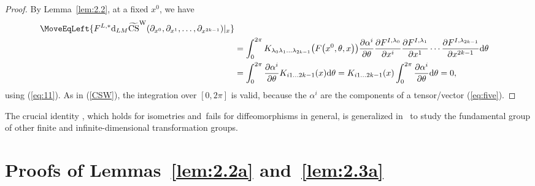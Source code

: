 \documentclass[pdftex]{sigma}
\numberwithin{equation}{section}
\theoremstyle{definition}
\newcommand{\bm}{ M}
\newcommand{\ocs}{\widetilde{{\rm CS}}}
\begin{document}
\begin{proof}
 By Lemma~\ref{lem:2.2}, at a fixed $x^0$, we have
 \begin{align*}
 \MoveEqLeft{ F^{L,*} {\rm d}_{L{\bm}} \ocs^{\rm W} (\partial_{x^0}, \partial_{x^1},\dots, \partial_{x^{2k-1}})|_{x} }\\
 &=
 \int_0^{2\pi} K_{\lambda_0 \lambda_1\dots\lambda_{2k-1}}\bigl(F\bigl(x^0,\theta,x\bigr)\bigr)
\frac{\partial \alpha^i}{\partial\theta} \frac{\partial F^{I,\lambda_0}}{\partial x^i}
\frac{\partial F^{I,\lambda_1}}{\partial x^1}
\cdots
\frac{\partial F^{I,\lambda_{2k-1}}}{\partial x^{2k-1}}
 {\rm d}\theta\\
 &=\int_0^{2\pi}\frac{\partial \alpha^i}{\partial\theta} K_{i1\dots 2k-1}(x) {\rm d}\theta
 = K_{i1\dots 2k-1}(x)\int_0^{2\pi}\frac{\partial \alpha^i}{\partial\theta} {\rm d}\theta=0,
 \end{align*}
 using (\ref{eq:11}).
 As in (\ref{CSW}), the integration over $[0, 2\pi]$ is valid, because the $\alpha^i$ are the components of a tensor/vector (\ref{eq:five}).
\end{proof}

The crucial identity , which holds for isometries and~fails for diffeomorphisms in general, is generalized in~\cite{MRTVI} to study the fundamental group of other finite and infinite-dimensional transformation groups.

\section{Proofs of Lemmas~\ref{lem:2.2a} and~\ref{lem:2.3a}}\label{app:B}
\end{document}

